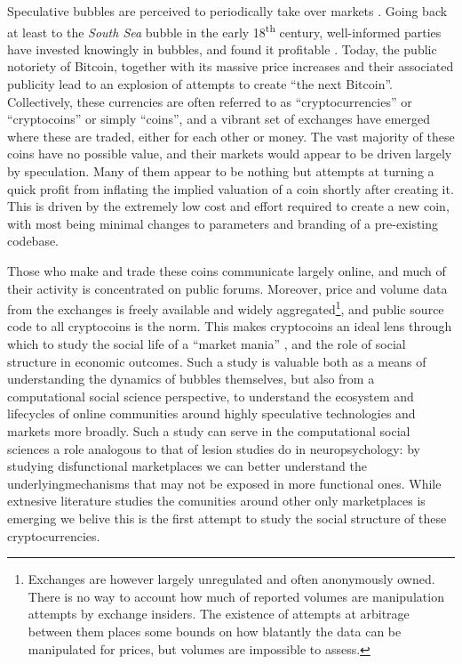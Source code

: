 Speculative bubbles are perceived to periodically take over markets \cite{garber2001famous}.
Going back at least to the \emph{South Sea} bubble in the early 18\textsuperscript{th} century, well-informed parties  have invested knowingly in bubbles, and found it profitable \cite{temin2004riding}.
Today, the public notoriety of Bitcoin, together with its massive price increases and their associated publicity lead to an explosion of attempts to create ``the next Bitcoin''.
Collectively, these currencies are often referred to as ``cryptocurrencies'' or ``cryptocoins'' or simply ``coins'', and a vibrant set of exchanges have emerged where these are traded, either for each other or money.
The vast majority of these coins have no possible value, and their markets would appear to be driven largely by speculation.
Many of them appear to be nothing but attempts at turning a quick profit from inflating the implied valuation of a coin shortly after creating it.
This is driven by the extremely low cost and effort required to create a new coin, with most being minimal changes to parameters and branding of a pre-existing codebase.

Those who make and trade these coins communicate largely online, and much of their activity is concentrated on public forums.
Moreover, price and volume data from the exchanges is freely available and widely aggregated\footnote{Exchanges are however largely unregulated and often anonymously owned. There is no way to account how much of reported volumes are manipulation attempts by exchange insiders. The existence of attempts at arbitrage between them places some bounds on how blatantly the data can be manipulated for prices, but volumes are impossible to assess. }, and public source code to all cryptocoins is the  norm.
This makes cryptocoins an ideal lens through which to study the social life of a ``market mania'' \cite{cosma2008}, and the role of social structure in economic outcomes\cite{granovetter2005impact}.
Such a study is valuable both as a means of understanding the dynamics of bubbles themselves, but also from a computational social science perspective, to understand the ecosystem and lifecycles of online communities around highly speculative technologies and markets more broadly.
Such a study can serve in the computational social sciences a role analogous to that of lesion studies do in neuropsychology: by studying disfunctional marketplaces we can better understand the underlyingmechanisms that may not be exposed in more functional ones.
While extnesive literature studies the comunities around other only marketplaces is emerging \cite{sastry2015predicting, gilbert2013need, luckman2013aura, chang2014specialization } we belive this is the first attempt to study the social structure of these cryptocurrencies.


